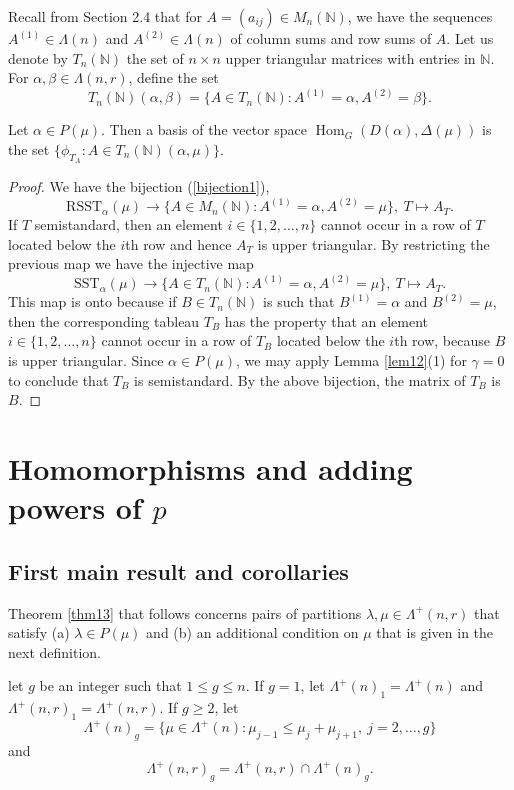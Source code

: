 \documentclass[ALCO,Unicode]{cedram}
\newcommand{\al}{\alpha}
\newcommand{\La}{\Lambda}
\DeclareMathOperator{\Hom}{Hom}
\numberwithin{equation}{section}
\begin{document}
	Recall from Section 2.4 that for $A=(a_{ij}) \in M_{n}(\mathbb{N})$, we have the sequences $A^{(1)}\in \La(n)$ and $A^{(2)}\in \La(n)$ of column sums and row sums of $A$. Let us denote by $T_{n}(\mathbb{N})$ the set of $n \times n$ upper triangular matrices with entries in $\mathbb{N}$. For $\al, \beta  \in \La(n,r)$, define the set \[T_{n}(\mathbb{N})(\al, \beta) = \{A \in T_{n}(\mathbb{N}): A^{(1)}=\al, A^{(2)}=\beta\}.\]
	\begin{coro}\label{triang}
		Let $\al \in P(\mu)$. Then a basis of the vector space $\Hom_G(D(\al),\Delta(\mu))$ is the set $\{\phi_{T_A}: A \in T_{n}(\mathbb{N})(\al, \mu)\}$.
	\end{coro}
\begin{proof} We have the bijection (\ref{bijection1}), \[\mathrm{RSST}_{\al}(\mu) \to \{A \in M_{n}(\mathbb{N}): A^{(1)}=\al, A^{(2)}=\mu\}, \ T \mapsto A_T.\] If $T$ semistandard, then an element $i \in \{1,2,\dots,n\}$ cannot occur in a row of $T$ located below the $i$th row and hence $ A_T$ is upper triangular. By restricting the previous map we have the injective map \[\mathrm{SST}_{\al}(\mu) \to \{A \in T_{n}(\mathbb{N}): A^{(1)}=\al, A^{(2)}=\mu\}, \ T \mapsto A_T.\]
	This map is onto because if $B \in T_{n}(\mathbb{N})$ is such that $B^{(1)}=\al$ and $ B^{(2)}=\mu$, then the corresponding tableau $T_B$ has the property that an element $i \in \{1,2,\dots,n\}$ cannot occur in a row of $T_B$ located below the $i$th row, because $B$ is upper triangular. Since $\al \in P(\mu)$, we may apply  Lemma \ref{lem12}(1) for $\gamma =0$ to conclude that $T_B$ is semistandard. By the above bijection, the matrix of $T_B$ is $B$.
	\end{proof}

	\section{Homomorphisms and adding powers of \texorpdfstring{$p$}{p}}
	\subsection{First main result and corollaries} Theorem \ref{thm13} that follows concerns pairs of partitions $\lambda, \mu \in \La^+(n,r)$ that satisfy (a) $\lambda \in P(\mu)$ and (b) an additional condition on $\mu$ that is given in the next definition.
	\begin{defi}\label{def}
		let $g$ be an integer such that $1 \le g \le n$. If $g=1$, let $\La^{+}(n)_1=\La^{+}(n)$ and $\La^{+}(n,r)_1=\La^{+}(n,r)$. If $g \ge 2$, let \[ \La^{+}(n)_g=\{\mu \in \La^{+}(n): \mu_{j-1} \le \mu_j +\mu_{j+1}, \ j=2,\dots,g\} \] and \[\La^{+}(n,r)_g= \La^{+}(n,r) \cap \La^{+}(n)_g.\]
	\end{defi}
	
\end{document}
